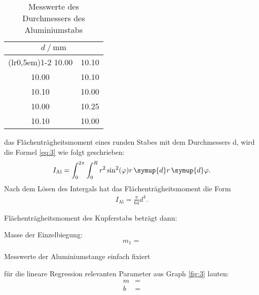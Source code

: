\begin{table}[H]
\centering
    \begin{tabular}{c c}
    \toprule
        \multicolumn{2}{c}{$d \:/\: \si{\milli\meter}$}\\
        \cmidrule(lr{0,5em}){1-2}
        10.00 & 10.10\\
        10.00 & 10.10\\
        10.10 & 10.00\\
        10.00 & 10.25\\
        10.10 & 10.00\\
        \bottomrule
    \end{tabular}
\caption{Messwerte des Durchmessers des Aluminiumstabs}
\label{tab:4}
\end{table}

\justifying das Flächenträgheitsmoment eines runden Stabes mit dem Durchmessers d, wird die Formel \eqref{eq:3} 
wie folgt geschrieben:
\begin{align}
    I_{\text{Al}}=\int_{0}^{2\pi} \int_{0}^{R} r^2 \sin^2(\varphi) r \, \symup{d}r \, \symup{d}\varphi \label{eq:}.
\end{align}
Nach dem Lösen des Intergals hat das Flächenträgheitsmoment die Form
\begin{align}
     I_{\text{Al}}=\frac{\pi}{64} d^4. \label{eq:}
\end{align}

\justifying Flächenträgheitsmoment des Kupferstabs beträgt dann:


\justifying Masse der Einzelbiegung:
\begin{equation}
    m_1 = \text{} \label{eq:}
\end{equation}

\begin{table}[H]
    \centering
    
    \caption{Messwerte der Aluminiumstange einfach fixiert}
    \label{tab:5}
\end{table}

\justifying für die lineare Regression relevanten Parameter aus Graph \ref{fig:3} lauten:
\begin{subequations}\label{eq:}
\begin{align}
    m &= \text{} \label{eq:a}\\
    b &= \text{} \label{eq:b}
\end{align}
\end{subequations}

